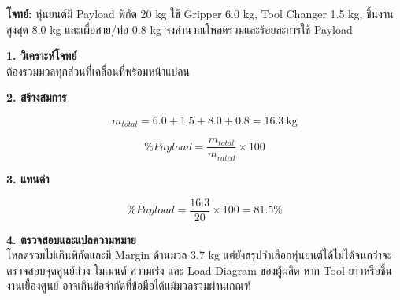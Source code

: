 \textbf{โจทย์:} หุ่นยนต์มี Payload พิกัด 20 kg ใช้ Gripper 6.0 kg, Tool Changer 1.5 kg, ชิ้นงานสูงสุด 8.0 kg และเผื่อสาย/ท่อ 0.8 kg จงคำนวณโหลดรวมและร้อยละการใช้ Payload

\textbf{1. วิเคราะห์โจทย์}\\
ต้องรวมมวลทุกส่วนที่เคลื่อนที่พร้อมหน้าแปลน

\textbf{2. สร้างสมการ}

\[
m_{total}=6.0+1.5+8.0+0.8=16.3\ \text{kg}
\]

\[
\%Payload=\frac{m_{total}}{m_{rated}}\times 100
\]

\textbf{3. แทนค่า}

\[
\%Payload=\frac{16.3}{20}\times100=81.5\%
\]

\textbf{4. ตรวจสอบและแปลความหมาย}\\
โหลดรวมไม่เกินพิกัดและมี Margin ด้านมวล 3.7 kg แต่ยังสรุปว่าเลือกหุ่นยนต์ได้ไม่ได้จนกว่าจะตรวจสอบจุดศูนย์ถ่วง โมเมนต์ ความเร่ง และ Load Diagram ของผู้ผลิต หาก Tool ยาวหรือชิ้นงานเยื้องศูนย์ อาจเกินข้อจำกัดที่ข้อมือได้แม้มวลรวมผ่านเกณฑ์


